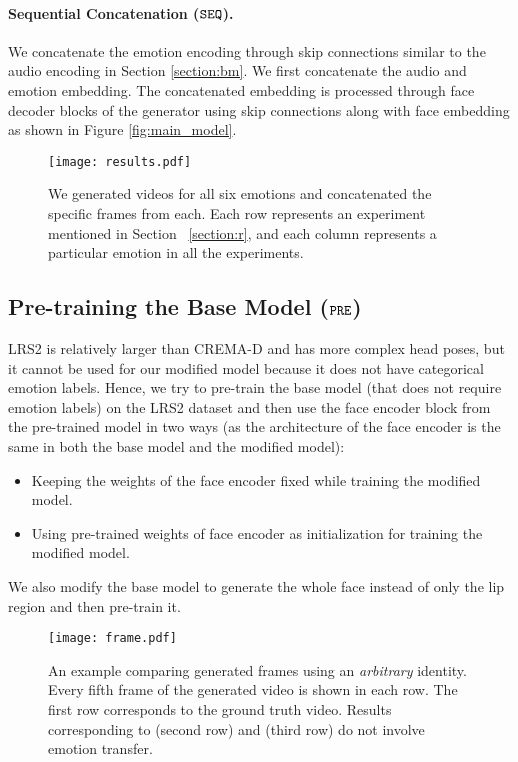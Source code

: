 \documentclass[accepted]{uai2023}
\begin{document}
 \paragraph{Sequential Concatenation (${\tt SEQ}$).}
    We concatenate the emotion encoding through skip connections similar to the audio encoding in Section \ref{section:bm}. We first concatenate the audio and emotion embedding. The concatenated embedding is processed through face decoder blocks of the generator using skip connections along with face embedding as shown in Figure \ref{fig:main_model}.



\begin{figure}[t]
\texttt{[image: results.pdf]}
    \caption{We generated videos for all six emotions and concatenated the specific frames from each. Each row represents an experiment mentioned in Section ~\ref{section:r}, and each column represents a particular emotion in all the experiments.}
    \label{fig:results}
\end{figure}



\subsection{Pre-training the Base Model (${\tt PRE}$)}
\label{section:pbm}
LRS2 \citep{afouras2018deep} is relatively larger than CREMA-D \citep{cao2014crema} and has more complex head poses, but it cannot be used for our modified model because it does not have categorical emotion labels. Hence, we try to pre-train the base model (that does not require emotion labels) on the LRS2 dataset and then use the face encoder block from the pre-trained model in two ways (as the architecture of the face encoder is the same in both the base model and the modified model):
\begin{itemize}
    \item Keeping the weights of the face encoder fixed while training the modified model.
    \item Using pre-trained weights of face encoder as initialization for training the modified model.
\end{itemize}
We also modify the base model to generate the whole face instead of only the lip region and then pre-train it.



\begin{figure*}[t]
\texttt{[image: frame.pdf]}
\caption{An example comparing generated frames using an \emph{arbitrary} identity. Every fifth frame of the generated video is shown in each row. 
The first row corresponds to the ground truth video. Results corresponding to \citep{wang2021audio2head} (second row) and \citep{prajwal2020lip} (third row) do not involve emotion transfer.}
\label{fig:frame}
\end{figure*}
\end{document}
